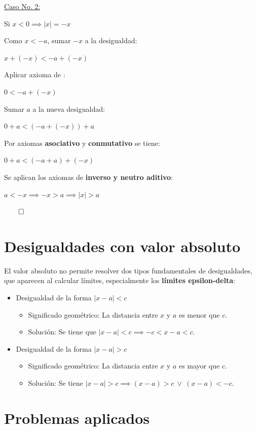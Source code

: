 \documentclass{article}
\begin{document}
\underline{Caso No. 2:}

Si $x < 0 \implies \mid x \mid = -x$

Como $x < - a$, sumar $- x$ a la desigualdad:

$x + (-x) < - a + (-x)$

Aplicar axioma de :

$0 < -a + (-x)$

Sumar $a$ a la nueva desigualdad:

$0 + a < (-a + (-x)) + a$

Por axiomas \textbf{asociativo} y  \textbf{conmutativo} se tiene:

$0 + a < (-a + a) + (-x)$

Se aplican los axiomas de \textbf{inverso y neutro aditivo}:

$a < - x \implies -x > a \implies \mid x \mid > a$

$\qed$

\section{Desigualdades con valor absoluto}

El valor absoluto no permite resolver dos tipos fundamentales de desigualdades, que aparecen al calcular límites, especialmente los \textbf{límites epsilon-delta}:

\begin{itemize}
    \item Desigualdad de la forma $\mid x - a \mid < c$
    \begin{itemize}
        \item Significado geométrico: La distancia entre $x$ y $a$ es menor que $c$.
        \item Solución: Se tiene que $\mid x - a \mid < c \implies -c < x - a < c$.
    \end{itemize}
    \item Desigualdad de la forma $\mid x - a \mid > c$
    \begin{itemize}
        \item Significado geométrico: La distancia entre $x$ y $a$ es mayor que $c$.
        \item Solución: Se tiene $\mid x - a \mid > c \implies (x - a) > c \ \lor \ (x - a) < - c$.
    \end{itemize}
\end{itemize}

\section{Problemas aplicados}
\end{document}
